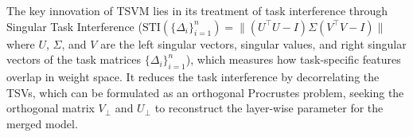 The key innovation of TSVM lies in its treatment of task interference through  Singular Task Interference ($\text{STI}(\{\Delta_i\}_{i=1}^n) = \|(U^\top U - I)\Sigma(V^\top V - I)\|$ where $U$, $\Sigma$, and $V$ are the left singular vectors, singular values, and right singular vectors of the task matrices $\{\Delta_i\}_{i=1}^n$), which measures how task-specific features overlap in weight space. It reduces the task interference by decorrelating the TSVs, which can be formulated as an orthogonal Procrustes problem, seeking the orthogonal matrix $V_{\bot}$ and $U_{\bot}$ to reconstruct the layer-wise parameter for the merged model.
\vspace{-0.2cm}
\begin{table}[H]  %
  \centering
  \caption{\textbf{Dataset statistics for our DPO training.}}
  \label{tab:dpo_data_stats}
  \vspace*{-5pt}  %
\end{table}


